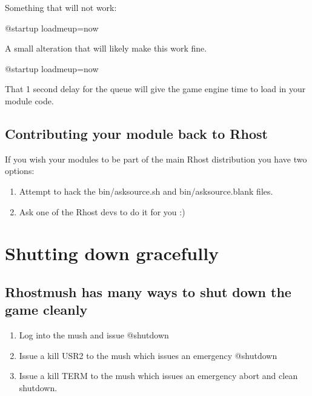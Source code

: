 \documentclass[letterpaper,10pt,english]{sphinxmanual}
\begin{document}
\sphinxAtStartPar
Something that will not work:

\sphinxAtStartPar
@startup  loadmeup=now

\sphinxAtStartPar
A small alteration that will likely make this work fine.

\sphinxAtStartPar
@startup   loadmeup=now

\sphinxAtStartPar
That 1 second delay for the queue will give the game engine time to load in your module code.


\section{Contributing your module back to Rhost}
\label{\detokenize{16-modules:contributing-your-module-back-to-rhost}}
\sphinxAtStartPar
If you wish your modules to be part of the main Rhost distribution you have two options:
\begin{enumerate}
%
\item {} 
\sphinxAtStartPar
Attempt to hack the bin/asksource.sh and bin/asksource.blank files.

\item {} 
\sphinxAtStartPar
Ask one of the Rhost devs to do it for you :)

\end{enumerate}


\chapter{Shutting down gracefully}
\label{\detokenize{17-shutdown:shutting-down-gracefully}}\label{\detokenize{17-shutdown::doc}}

\section{Rhostmush has many ways to shut down the game cleanly}
\label{\detokenize{17-shutdown:rhostmush-has-many-ways-to-shut-down-the-game-cleanly}}\begin{enumerate}
%
\item {} 
\sphinxAtStartPar
Log into the mush and issue @shutdown

\item {} 
\sphinxAtStartPar
Issue a kill \sphinxhyphen{}USR2 to the mush which issues an emergency @shutdown

\item {} 
\sphinxAtStartPar
Issue a kill \sphinxhyphen{}TERM to the mush which issues an emergency abort and clean shutdown.

\end{enumerate}
\end{document}
